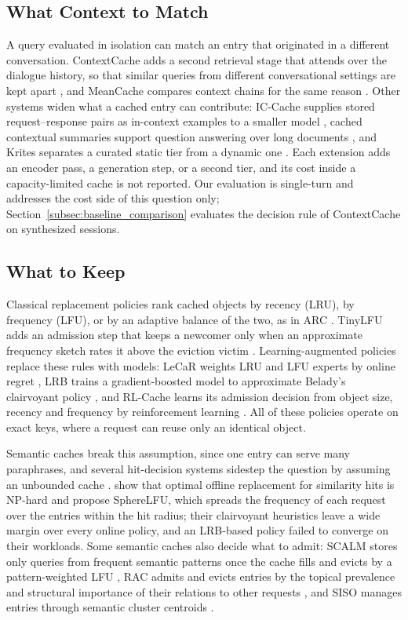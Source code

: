 \documentclass[authoryear,preprint,review,12pt]{elsarticle}
\begin{document}
\subsection{What Context to Match}
\label{subsec:rw_context}
A query evaluated in isolation can match an entry that originated in a different conversation. ContextCache adds a second retrieval stage that attends over the dialogue history, so that similar queries from different conversational settings are kept apart \citep{Yan2025ContextCache}, and MeanCache compares context chains for the same reason \citep{gill2024meancache}. Other systems widen what a cached entry can contribute: IC-Cache supplies stored request--response pairs as in-context examples to a smaller model \citep{Yu2025ICCache}, cached contextual summaries support question answering over long documents \citep{Couturier2025Semantic}, and Krites separates a curated static tier from a dynamic one \citep{singh2026krites}. Each extension adds an encoder pass, a generation step, or a second tier, and its cost inside a capacity-limited cache is not reported. Our evaluation is single-turn and addresses the cost side of this question only; Section~\ref{subsec:baseline_comparison} evaluates the decision rule of ContextCache on synthesized sessions.

\subsection{What to Keep}
\label{subsec:rw_capacity}
Classical replacement policies rank cached objects by recency (LRU), by frequency (LFU), or by an adaptive balance of the two, as in ARC \citep{megiddo2003arc}. TinyLFU adds an admission step that keeps a newcomer only when an approximate frequency sketch rates it above the eviction victim \citep{einziger2017tinylfu}. Learning-augmented policies replace these rules with models: LeCaR weights LRU and LFU experts by online regret \citep{vietri2018lecar}, LRB trains a gradient-boosted model to approximate Belady's clairvoyant policy \citep{song2020lrb}, and RL-Cache learns its admission decision from object size, recency and frequency by reinforcement learning \citep{kirilin2020rlcache}. All of these policies operate on exact keys, where a request can reuse only an identical object.

Semantic caches break this assumption, since one entry can serve many paraphrases, and several hit-decision systems sidestep the question by assuming an unbounded cache \citep{biton2026spherelfu}. \citet{biton2026spherelfu} show that optimal offline replacement for similarity hits is NP-hard and propose SphereLFU, which spreads the frequency of each request over the entries within the hit radius; their clairvoyant heuristics leave a wide margin over every online policy, and an LRB-based policy failed to converge on their workloads. Some semantic caches also decide what to admit: SCALM stores only queries from frequent semantic patterns once the cache fills and evicts by a pattern-weighted LFU \citep{li2024scalm}, RAC admits and evicts entries by the topical prevalence and structural importance of their relations to other requests \citep{wu2026rac}, and SISO manages entries through semantic cluster centroids \citep{kim2025siso}.
\end{document}
